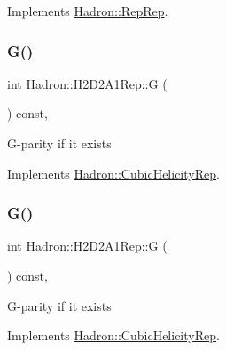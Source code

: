 Implements \mbox{\hyperlink{structHadron_1_1RepRep_a92c8802e5ed7afd7da43ccfd5b7cd92b}{Hadron\+::\+Rep\+Rep}}.

\mbox{\label{structHadron_1_1H2D2A1Rep_a675ce644f7ba030fdfaf81297919a9c1}} 
\subsubsection{\texorpdfstring{G()}{G()}\hspace{0.1cm}{\footnotesize\ttfamily [1/3]}}
{\footnotesize\ttfamily int Hadron\+::\+H2\+D2\+A1\+Rep\+::G (\begin{DoxyParamCaption}{ }\end{DoxyParamCaption}) const\hspace{0.3cm}{\ttfamily [inline]}, {\ttfamily [virtual]}}

G-\/parity if it exists 

Implements \mbox{\hyperlink{structHadron_1_1CubicHelicityRep_a50689f42be1e6170aa8cf6ad0597018b}{Hadron\+::\+Cubic\+Helicity\+Rep}}.

\mbox{\label{structHadron_1_1H2D2A1Rep_a675ce644f7ba030fdfaf81297919a9c1}} 
\subsubsection{\texorpdfstring{G()}{G()}\hspace{0.1cm}{\footnotesize\ttfamily [2/3]}}
{\footnotesize\ttfamily int Hadron\+::\+H2\+D2\+A1\+Rep\+::G (\begin{DoxyParamCaption}{ }\end{DoxyParamCaption}) const\hspace{0.3cm}{\ttfamily [inline]}, {\ttfamily [virtual]}}

G-\/parity if it exists 

Implements \mbox{\hyperlink{structHadron_1_1CubicHelicityRep_a50689f42be1e6170aa8cf6ad0597018b}{Hadron\+::\+Cubic\+Helicity\+Rep}}.

\mbox{\label{structHadron_1_1H2D2A1Rep_a675ce644f7ba030fdfaf81297919a9c1}} 
